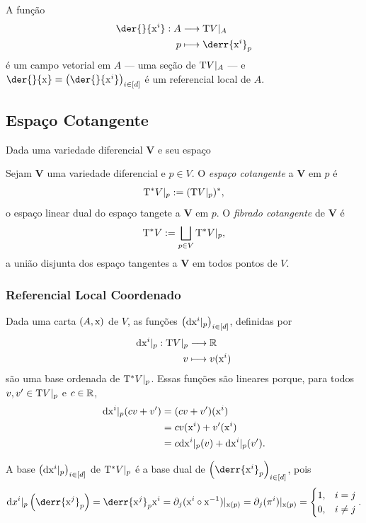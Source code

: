 A função
	\begin{align*}
	\func{\der{}{\x^i}}{A}{\Tg V|_A}{p}{\derr{\x^i}_p}
	\end{align*}
é um campo vetorial em $A$ --- uma seção de $\mathrm{T} V|_A$ --- e $\der{}{\x} = \left( \der{}{\x^i} \right)_{i \in [d]}$ é um referencial local de $A$.


\subsection{Espaço Cotangente}

Dada uma variedade diferencial $\bm V$ e seu espaço
\begin{defi}
Sejam $\bm V$ uma variedade diferencial e $p \in V$. O \emph{espaço cotangente} a $\bm V$ em $p$ é
	\begin{equation*}
	\mathrm{T}^* V|_p := (\mathrm{T} V|_p)^*,
	\end{equation*}
o espaço linear dual do espaço tangete a $\bm V$ em $p$. O \emph{fibrado cotangente} de $\bm V$ é
	\begin{equation*}
	\mathrm{T}^* V := \bigsqcup_{p \in V} \mathrm{T}^* V|_p,
	\end{equation*}
a união disjunta dos espaço tangentes a $\bm V$ em todos pontos de $V$.
\end{defi}

\subsubsection{Referencial Local Coordenado}

Dada uma carta $(A,\mathrm{x})$ de $V$, as funções $\left( \mathrm{d} \mathrm{x}^i|_p \right)_{i \in [d]}$, definidas por
	\begin{align*}
	{\mathrm{d}\mathrm{x}^i|_p}: {\mathrm{T} V|_p} &\longrightarrow {\mathbb{R}} \\{v} &\longmapsto {v(\mathrm{x}^i)}
	\end{align*}
são uma base ordenada de $\mathrm{T}^* V|_p$. Essas funções são lineares porque, para todos $v,v' \in \mathrm{T} V|_p$ e $c \in \mathbb{R}$,
	\begin{align*}
	\mathrm{d} \mathrm{x}^i|_p(cv+v') &= (cv+v')(\mathrm{x}^i) \\
		&= cv(\mathrm{x}^i) + v'(\mathrm{x}^i) \\
		&= c\mathrm{d} \mathrm{x}^i|_p(v) + \mathrm{d} \mathrm{x}^i|_p(v').
	\end{align*}

A base $\left( \mathrm{d} \mathrm{x}^i|_p \right)_{i \in [d]}$ de $\mathrm{T}^* V|_p$ é a base dual de $\left( \derr{\x^i}_{p} \right)_{i \in [d]}$, pois
	\begin{equation*}
	\dd x^i|_p\left(\derr{\x^j}_{p}\right) = \derr{\x^j}_{p}\x^i = \partial_j(\x^i \circ \x\inv)|_{\x(p)} = \partial_j(\pi^i)|_{\x(p)} = 
		\begin{cases}
			1,& i=j \\
			0,& i \neq j
		\end{cases}.
	\end{equation*}





